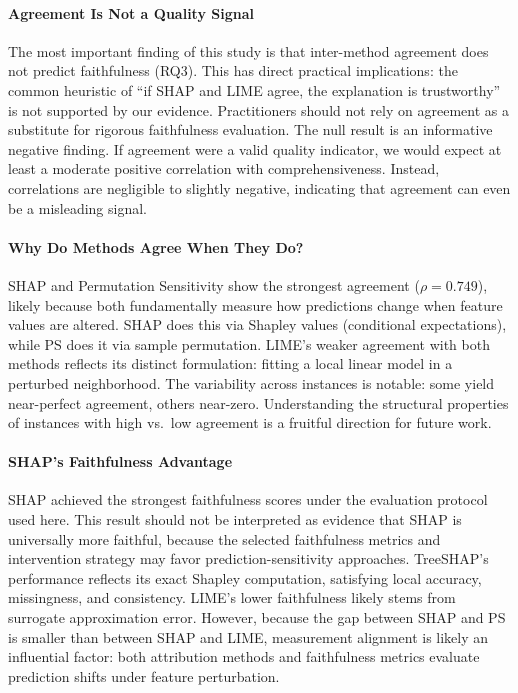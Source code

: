 \documentclass[conference, 10pt]{IEEEtran}
\begin{document}
\paragraph{Agreement Is Not a Quality Signal}
The most important finding of this study is that inter-method agreement does not predict faithfulness (RQ3). This has direct practical implications: the common heuristic of ``if SHAP and LIME agree, the explanation is trustworthy'' is not supported by our evidence. Practitioners should not rely on agreement as a substitute for rigorous faithfulness evaluation.
The null result is an informative negative finding. If agreement were a valid quality indicator, we would expect at least a moderate positive correlation with comprehensiveness. Instead, correlations are negligible to slightly negative, indicating that agreement can even be a misleading signal.

\paragraph{Why Do Methods Agree When They Do?}
SHAP and Permutation Sensitivity show the strongest agreement ($\rho = 0.749$), likely because both fundamentally measure how predictions change when feature values are altered. SHAP does this via Shapley values (conditional expectations), while PS does it via sample permutation. LIME's weaker agreement with both methods reflects its distinct formulation: fitting a local linear model in a perturbed neighborhood.
The variability across instances is notable: some yield near-perfect agreement, others near-zero. Understanding the structural properties of instances with high vs.\ low agreement is a fruitful direction for future work.

\paragraph{SHAP's Faithfulness Advantage}
SHAP achieved the strongest faithfulness scores under the evaluation protocol used here. This result should not be interpreted as evidence that SHAP is universally more faithful, because the selected faithfulness metrics and intervention strategy may favor prediction-sensitivity approaches. TreeSHAP's performance reflects its exact Shapley computation, satisfying local accuracy, missingness, and consistency. LIME's lower faithfulness likely stems from surrogate approximation error. However, because the gap between SHAP and PS is smaller than between SHAP and LIME, measurement alignment is likely an influential factor: both attribution methods and faithfulness metrics evaluate prediction shifts under feature perturbation.
\end{document}
